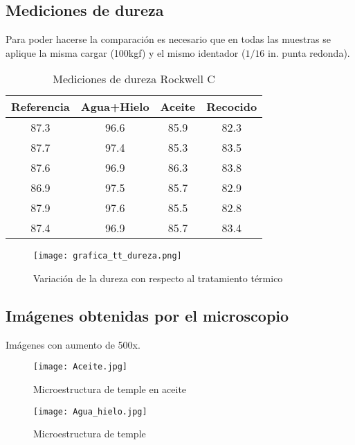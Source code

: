 \documentclass[a4paper, 9pt]{article}
\begin{document}
	
\subsection{Mediciones de dureza}
Para poder hacerse la comparación es necesario que en todas las muestras se aplique la misma cargar (100kgf) y el mismo identador ($1/16$ in. punta redonda).
\begin{table}[htbp]
\begin{center}
\begin{tabular}{|c|c|c|c|}
\hline
Referencia & Agua+Hielo & Aceite & Recocido \\
\hline 
87.3 & 96.6 & 85.9 & 82.3 \\ 
\hline
87.7 & 97.4 & 85.3 & 83.5 \\ 
\hline
87.6 & 96.9 & 86.3 & 83.8 \\ 
\hline
86.9 & 97.5 & 85.7 & 82.9 \\ 
\hline
87.9 & 97.6 & 85.5 & 82.8 \\ 
\hline
87.4 & 96.9 & 85.7 & 83.4 \\ 
\hline
\end{tabular}
\caption{Mediciones de dureza Rockwell C}
\label{mediciones_de_dureza}
\end{center}
\end{table}

\begin{figure}[h!] 
\centering
    \texttt{[image: grafica\_tt\_dureza.png]}
     \caption{Variación de la dureza con respecto al tratamiento térmico}
    \label{grafica_tt_dureza}
\end{figure}
\newpage
\subsection{Imágenes obtenidas por el microscopio} \label{sec:anexos}
Imágenes con aumento de 500x.

\begin{figure}[h] %

\hfill
\begin{minipage}[t]{.45\textwidth}
\begin{center}
\texttt{[image: Aceite.jpg]}
\caption{Microestructura de temple en aceite}
\label{micro_normalizado}
\end{center}
\end{minipage}
\hfill
\begin{minipage}[t]{.45\textwidth}
\begin{center}
\texttt{[image: Agua\_hielo.jpg]}
\caption{Microestructura de temple}
\label{micro_temple}
\end{center}
\end{minipage}
\hfill
\end{figure}
\end{document}
